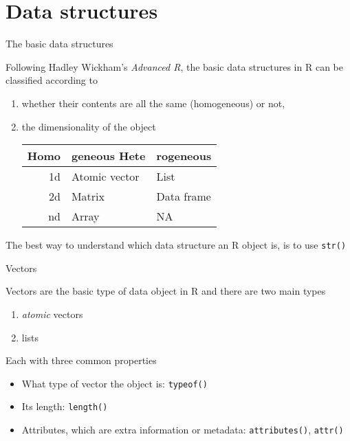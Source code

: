 \documentclass[10pt,ignorenonframetext,compress, aspectratio=169]{beamer}
\providecommand{\tightlist}{%
  \setlength{\itemsep}{0pt}\setlength{\parskip}{0pt}}
\begin{document}
\section{Data structures}\label{data-structures}

\begin{frame}[fragile]{The basic data structures}

Following Hadley Wickham's \emph{Advanced R}, the basic data structures
in R can be classified according to

\begin{enumerate}
\def\labelenumi{\arabic{enumi}.}
\item
  whether their contents are all the same (homogeneous) or not,
\item
  the dimensionality of the object

  \begin{longtable}[]{@{}rll@{}}
  \toprule
  Homo & geneous Hete & rogeneous\tabularnewline
  \midrule
  \endhead
  1d & Atomic vector & List\tabularnewline
  2d & Matrix & Data frame\tabularnewline
  nd & Array & NA\tabularnewline
  \bottomrule
  \end{longtable}
\end{enumerate}

The best way to understand which data structure an R object is, is to
use \texttt{str()}

\end{frame}

\begin{frame}[fragile]{Vectors}

Vectors are the basic type of data object in R and there are two main
types

\begin{enumerate}
\def\labelenumi{\arabic{enumi}.}
\tightlist
\item
  \emph{atomic} vectors
\item
  lists
\end{enumerate}

Each with three common properties

\begin{itemize}
\tightlist
\item
  What type of vector the object is: \texttt{typeof()}
\item
  Its length: \texttt{length()}
\item
  Attributes, which are extra information or metadata:
  \texttt{attributes()}, \texttt{attr()}
\end{itemize}

\end{frame}
\end{document}
